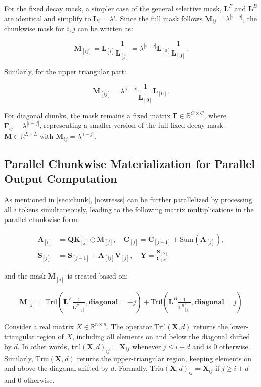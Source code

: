 For the fixed decay mask, a simpler case of the general selective mask, \(\mathbf{L}^F\) and \(\mathbf{L}^B\) are identical and simplify to \(\mathbf{L}_i = \lambda^i\). Since the full mask follows \(\mathbf{M}_{ij} = \lambda^{|i-j|}\), the chunkwise mask for \(i, j\) can be written as:

\[
\mathbf{M}_{[ij]} = \mathbf{L}_{[i]} \frac{1}{\mathbf{L}_{[j]}} = \lambda^{|i-j|} \mathbf{L}_{[0]} \frac{1}{\mathbf{L}_{[0]}}.
\]

Similarly, for the upper triangular part:

\[
\mathbf{M}_{[ij]} = \lambda^{|i-j|} \frac{1}{\mathbf{L}^\top_{[0]}} \mathbf{L}_{[0]}.
\]

For diagonal chunks, the mask remains a fixed matrix \(\mathbf{\Gamma} \in \mathbb{R}^{C \times C}\), where \(\mathbf{\Gamma}_{ij} = \lambda^{|i-j|}\), representing a smaller version of the full fixed decay mask \(\mathbf{M} \in \mathbb{R}^{L \times L}\) with \(\mathbf{M}_{ij} = \lambda^{|i-j|}\).


\subsection{Parallel Chunkwise Materialization for Parallel Output Computation} \label{parpar}

As mentioned in \cref{sec:chunk}, \cref{nowresss} can be further parallelized by processing all \(i\) tokens simultaneously, leading to the following matrix multiplications in the parallel chunkwise form:

\begin{align}
     \mathbf{A}_{[i]} & = \mathbf{Q}\mathbf{K}_{[j]}^\top \odot \mathbf{M}_{[j]}, \quad \mathbf{C}_{[j]} = \mathbf{C}_{[j-1]} + \text{Sum} (\mathbf{A}_{[j]}), \\
     \mathbf{S}_{[j]} & =\mathbf{S}_{[j-1]} + \mathbf{A}_{[ij]} \mathbf{V}_{[j]} , \quad \mathbf{Y} = \frac{\mathbf{S}_{[N]}}{\mathbf{C}_{[N]}}
\end{align}

and the mask $\mathbf{M}_{[j]}$ is created based on:

\begin{align}
\mathbf{M}_{[j]} = \text{Tril}(\mathbf{L}^F \frac{1}{{\mathbf{L}^F}^\top_{[j]}} , \textbf{diagonal}=-j) + \text{Tril}(\mathbf{L}^B \frac{1}{{\mathbf{L}^B}^\top_{[j]}} , \textbf{diagonal}=j)
\end{align}

Consider a real matrix \(X \in \mathbb{R}^{n \times n}\). The operator \(\mathrm{Tril}(\mathbf{X}, d)\) returns the lower-triangular region of \(X\), including all elements on and below the diagonal shifted by \(d\). In other words, \(\mathrm{tril}(\mathbf{X}, d)_{ij} = \mathbf{X}_{ij}\) whenever \(j \leq i + d\) and is \(0\) otherwise. Similarly, \(\mathrm{Triu}(\mathbf{X}, d)\) returns the upper-triangular region, keeping elements on and above the diagonal shifted by \(d\). Formally, \(\mathrm{Triu}(\mathbf{X}, d)_{ij} = \mathbf{X}_{ij}\) if \(j \geq i + d\) and \(0\) otherwise.






